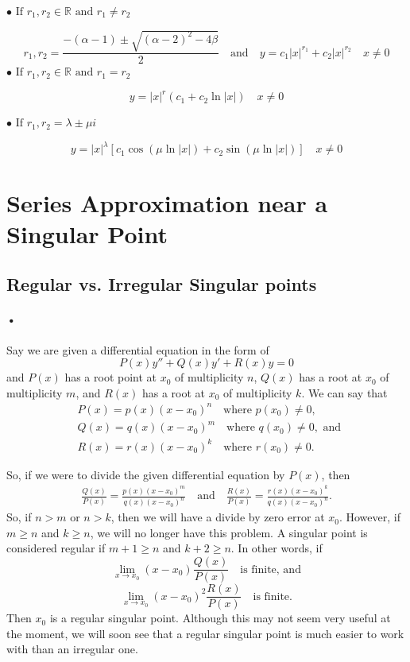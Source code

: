 \documentclass[font =22]{report}
\begin{document}
 $\bullet \text{ If }  r_1,r_2 \in \mathbb{R} \text{ and }r_1 \neq r_2 $
 
 \[
 r_1,r_2 = \frac{-(\alpha - 1) \pm \sqrt{(\alpha - 2)^2 - 4\beta}}{2} \quad \text{and} \quad y = c_1|x|^{r_1}+c_2|x|^{r_2} \quad x \neq  0
 \]
$\bullet \text{ If } r_1,r_2 \in \mathbb{R} \text{ and }r_1 = r_2 $
 
 \[
 y = |x|^r(c_1+c_2 \ln |x| )  \quad x \neq  0
 \] 
 
 $\bullet \text{ If } r_1,r_2 = \lambda \pm \mu i$
 
 \[
 y = |x|^\lambda[c_1 \cos ( \mu \ln |x|)+ c_2 \sin( \mu \ln |x| )] \quad  x \neq  0
 \]
 
  
  \section{Series Approximation near a Singular Point}
  \subsection{Regular vs. Irregular Singular points}
 \paragraph{•}
 Say we are given a differential equation in the form of 
 \[
 P(x)y'' + Q(x)y' + R(x) y = 0
 \]
 and $P(x)$ has a root point at $x_0$ of multiplicity $n$, $Q(x)$ has a root at $x_0$ of multiplicity $m$, and $R(x)$ has a root at $x_0$ of multiplicity $k$.
  We can say that 
  \begin{align*}
  &P(x) = p(x)(x-x_0)^n \quad \text {where } p(x_0) \neq 0, \\
  &Q(x) = q(x)(x-x_0)^m \quad \text {where } q(x_0) \neq 0, \text{ and } \\
  & R(x) = r(x) (x-x_0)^k \quad \text  {where } r(x_0) \neq 0.
  \end{align*}

  So, if we were to divide the given differential equation by $P(x)$, then 
  \begin{align*}
  \frac{Q(x)}{P(x)} = \frac{p(x)(x-x_0)^m}{q(x)(x-x_0)^n} \quad \text{and}  \quad
  \frac{R(x)}{P(x)} = \frac{r(x)(x-x_0)^k}{q(x)(x-x_0)^n}. 
  \end{align*}
  So, if $n>m$ or $n>k$, then we will have a divide by zero error at $x_0$. However, if $m \geq n $ and $k \geq n$, we will no longer have this problem. A singular point is considered regular if $m+1 \geq n$ and $k+2 \geq n$. In other words, if 
  \[
  \lim_{x \to x_0} (x-x_0)\frac{Q(x)}{P(x)} \quad \text{is finite, and} 
  \]
  \[\lim_{x \to x_0} (x-x_0)^2 \frac{R(x)}{P(x)} \quad \text{is finite.}
  \]
  Then $x_0$ is a regular singular point. Although this may not seem very useful at the moment, we will soon see that a regular singular point is much easier to work with than an irregular one.
\end{document}
